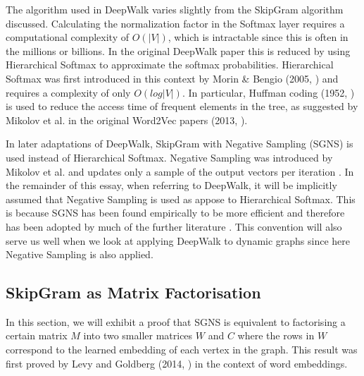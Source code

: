 \documentclass[a4paper]{article}
\begin{document}
The algorithm used in DeepWalk varies slightly from the SkipGram algorithm
discussed. Calculating the normalization factor in the Softmax layer requires a
computational complexity of $O(|V|)$, which is intractable since this is often
in the millions or billions. In the original DeepWalk paper this is
reduced by using Hierarchical Softmax to approximate the softmax probabilities. Hierarchical Softmax was first introduced in this context by Morin \& Bengio (2005, \cite{morin2005}) and 
requires a complexity of only $O(log|V|)$. In particular, Huffman coding (1952, \cite{huffman1952}) is
used to reduce the access time of frequent elements in the tree, as suggested by
Mikolov et al. in the original Word2Vec
papers (2013, \cite{mikolov2013efficient,mikolov2013distributed}).

In later adaptations of DeepWalk, SkipGram with Negative Sampling (SGNS) is used instead of
Hierarchical Softmax. Negative Sampling was introduced by Mikolov et al. and updates only a sample of the output
vectors per iteration \cite{mikolov2013distributed}. In the remainder of this essay, when referring to DeepWalk, it will be
implicitly assumed that Negative Sampling is used as appose to Hierarchical
Softmax. This is because SGNS has been found empirically to be more efficient
and therefore has been adopted by much of the further literature \cite{mikolov2013distributed}. This convention will also
serve us well when we look at applying DeepWalk to dynamic graphs since here
Negative Sampling is also applied.\\
\subsection{SkipGram as Matrix Factorisation}
In this section, we will exhibit a proof that SGNS is
equivalent to factorising a certain matrix $M$ into two smaller matrices $W$
and $C$ where the rows in $W$ correspond to the learned embedding of each vertex
in the graph. This result was first proved by Levy and
Goldberg (2014, \cite{levy&goldberg}) in the context of word embeddings.\\
\end{document}
